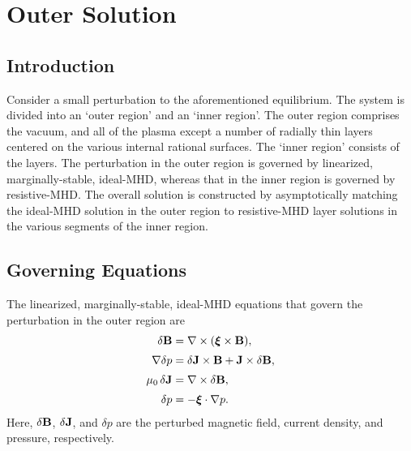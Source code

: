 \documentclass[12pt,prb,aps,notitlepage]{revtex4-1}
\newcommand {\bxi} {\mbox{\boldmath$\xi$}}
\begin{document}
\section{Outer Solution}
\subsection{Introduction}
Consider a small perturbation to the aforementioned equilibrium. 
The system is divided into an `outer region' and an `inner region'.  The outer region comprises the vacuum, and all of the plasma except
a number of radially thin layers centered on the various internal rational surfaces. The `inner region'
 consists of the layers. The perturbation in the outer
region is governed by linearized, marginally-stable, ideal-MHD, whereas that in the inner region is governed by
 resistive-MHD. The overall solution is constructed by asymptotically matching the ideal-MHD solution in the
outer region to  resistive-MHD  layer solutions in the various segments of the inner region. 

\subsection{Governing  Equations}
The linearized, marginally-stable, ideal-MHD equations that govern the perturbation in the outer region are
\begin{align}\label{e20}
\delta{\bf B} &= \nabla\times(\bxi\times{\bf B}),\\[0.5ex]
\nabla\delta p &=\delta{\bf J}\times {\bf B}+ {\bf J}\times \delta{\bf B},\\[0.5ex]
\mu_0\,\delta{\bf J} &=\nabla\times \delta{\bf B},\\[0.5ex]
\delta p& =-\bxi\cdot\nabla p.\label{e22}
\end{align}
Here, $\delta{\bf B}$, $\delta{\bf J}$, and $\delta p$ are the perturbed magnetic field, current density, and pressure,
respectively. 
\end{document}
